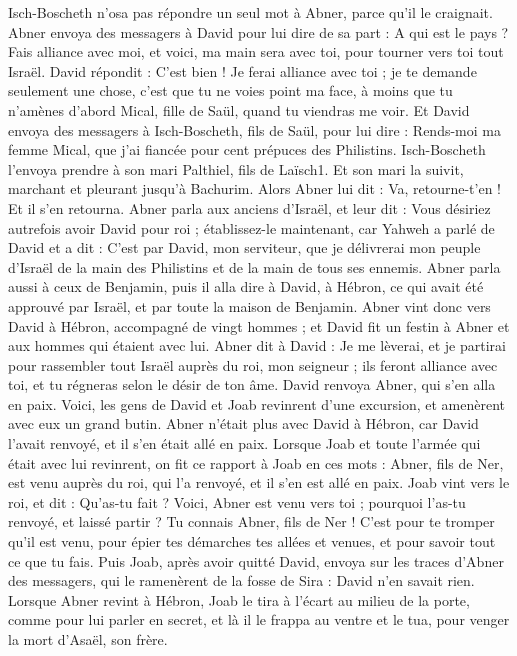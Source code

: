 \begin{multicols}{2}
Isch-Boscheth n'osa pas répondre un seul mot à Abner, parce qu'il le craignait.
Abner envoya des messagers à David pour lui dire de sa part : A qui est le pays ? Fais alliance avec moi, et voici, ma main sera avec toi, pour tourner vers toi tout Israël.
David répondit : C’est bien ! Je ferai alliance avec toi ; je te demande seulement une chose, c'est que tu ne voies point ma face, à moins que tu n’amènes d’abord Mical, fille de Saül, quand tu viendras me voir.
Et David envoya des messagers à Isch-Boscheth, fils de Saül, pour lui dire : Rends-moi ma femme Mical, que j'ai fiancée pour cent prépuces des Philistins.
Isch-Boscheth l’envoya prendre à son mari Palthiel, fils de Laïsch1.
Et son mari la suivit, marchant et pleurant jusqu'à Bachurim. Alors Abner lui dit : Va, retourne-t'en ! Et il s'en retourna.
Abner parla aux anciens d'Israël, et leur dit : Vous désiriez autrefois avoir David pour roi ;
établissez-le maintenant, car Yahweh a parlé de David et a dit : C’est par David, mon serviteur, que je délivrerai mon peuple d'Israël de la main des Philistins et de la main de tous ses ennemis.
Abner parla aussi à ceux de Benjamin, puis il alla dire à David, à Hébron, ce qui avait été approuvé par Israël, et par toute la maison de Benjamin.
Abner vint donc vers David à Hébron, accompagné de vingt hommes ; et David fit un festin à Abner et aux hommes qui étaient avec lui.
Abner dit à David : Je me lèverai, et je partirai pour rassembler tout Israël auprès du roi, mon seigneur ; ils feront alliance avec toi, et tu régneras selon le désir de ton âme. David renvoya Abner, qui s'en alla en paix.
Voici, les gens de David et Joab revinrent d’une excursion, et amenèrent avec eux un grand butin. Abner n'était plus avec David à Hébron, car David l'avait renvoyé, et il s'en était allé en paix.
Lorsque Joab et toute l'armée qui était avec lui revinrent, on fit ce rapport à Joab en ces mots : Abner, fils de Ner, est venu auprès du roi, qui l'a renvoyé, et il s'en est allé en paix.
Joab vint vers le roi, et dit : Qu'as-tu fait ? Voici, Abner est venu vers toi ; pourquoi l'as-tu renvoyé, et laissé partir ?
Tu connais Abner, fils de Ner ! C’est pour te tromper qu’il est venu, pour épier tes démarches tes allées et venues, et pour savoir tout ce que tu fais.
Puis Joab, après avoir quitté David, envoya sur les traces d’Abner des messagers, qui le ramenèrent de la fosse de Sira : David n’en savait rien.
Lorsque Abner revint à Hébron, Joab le tira à l’écart au milieu de la porte, comme pour lui parler en secret, et là il le frappa au ventre et le tua, pour venger la mort d’Asaël, son frère.

\end{multicols}
